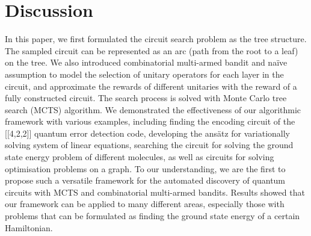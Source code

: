 \documentclass[a4paper,onecolumn,11pt]{quantumarticle}
\begin{document}
\section{Discussion}\label{discussion}
In this paper, we first formulated the circuit search problem as the tree structure. The sampled circuit can be represented as an arc (path from the root to a leaf) on the tree. We also introduced combinatorial multi-armed bandit and na\"ive assumption to model the selection of unitary operators for each layer in the circuit, and approximate the rewards of different unitaries with the reward of a fully constructed circuit. The search process is solved with Monte Carlo tree search (MCTS) algorithm. We demonstrated the effectiveness of our algorithmic framework with various examples, including finding the encoding circuit of the [[4,2,2]] quantum error detection code, developing the ans\"atz for variationally solving system of linear equations, searching the circuit for solving the ground state energy problem of different molecules, as well as circuits for solving optimisation problems on a graph. To our understanding, we are the first to propose such a versatile framework for the automated discovery of quantum circuits with MCTS and combinatorial multi-armed bandits. Results showed that our framework can be applied to many different areas, especially those with problems that can be formulated as finding the ground state energy of a certain Hamiltonian.
\end{document}
